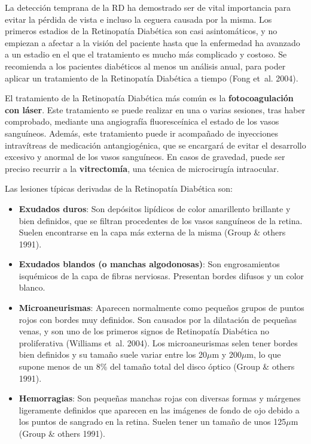 \documentclass[
  12pt,
  spanish,
  a4paperpaper,
]{report}
\providecommand{\tightlist}{%
  \setlength{\itemsep}{0pt}\setlength{\parskip}{0pt}}
\begin{document}
La detección temprana de la RD ha demostrado ser de vital importancia
para evitar la pérdida de vista e incluso la ceguera causada por la
misma. Los primeros estadios de la Retinopatía Diabética son casi
asintomáticos, y no empiezan a afectar a la visión del paciente hasta
que la enfermedad ha avanzado a un estadio en el que el tratamiento es
mucho más complicado y costoso. Se recomienda a los pacientes diabéticos
al menos un análisis anual, para poder aplicar un tratamiento de la
Retinopatía Diabética a tiempo (Fong et~al. 2004).

El tratamiento de la Retinopatía Diabética más común es la
\textbf{fotocoagulación con láser}. Este tratamiento se puede realizar
en una o varias sesiones, tras haber comprobado, mediante una
angiografía fluoresceínica el estado de los vasos sanguíneos. Además,
este tratamiento puede ir acompañado de inyecciones intravítreas de
medicación antangiogénica, que se encargará de evitar el desarrollo
excesivo y anormal de los vasos sanguíneos. En casos de gravedad, puede
ser preciso recurrir a la \textbf{vitrectomía}, una técnica de
microcirugía intraocular.

Las lesiones típicas derivadas de la Retinopatía Diabética son:

\begin{itemize}
\tightlist
\item
  \textbf{Exudados duros}: Son depósitos lipídicos de color amarillento
  brillante y bien definidos, que se filtran procedentes de los vasos
  sanguíneos de la retina. Suelen encontrarse en la capa más externa de
  la misma (Group \& others 1991).
\item
  \textbf{Exudados blandos (o manchas algodonosas)}: Son engrosamientos
  isquémicos de la capa de fibras nerviosas. Presentan bordes difusos y
  un color blanco.
\item
  \textbf{Microaneurismas}: Aparecen normalmente como pequeños grupos de
  puntos rojos con bordes muy definidos. Son causados por la dilatación
  de pequeñas venas, y son uno de los primeros signos de Retinopatía
  Diabética no proliferativa (Williams et~al. 2004). Los microaneurismas
  selen tener bordes bien definidos y su tamaño suele variar entre los
  20\(\mu\)m y 200\(\mu\)m, lo que supone menos de un 8\% del tamaño
  total del disco óptico (Group \& others 1991).
\item
  \textbf{Hemorragias}: Son pequeñas manchas rojas con diversas formas y
  márgenes ligeramente definidos que aparecen en las imágenes de fondo
  de ojo debido a los puntos de sangrado en la retina. Suelen tener un
  tamaño de unos 125\(\mu\)m (Group \& others 1991).
\end{itemize}
\end{document}
